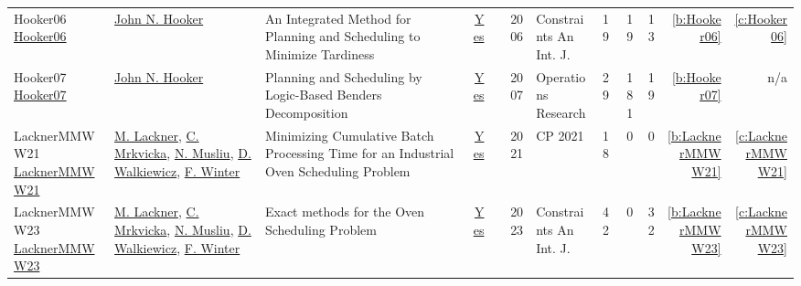 {\begin{longtable}{>{\raggedright\arraybackslash}p{3cm}>{\raggedright\arraybackslash}p{6cm}>{\raggedright\arraybackslash}p{6.5cm}rrrp{2.5cm}rrrrr}
Hooker06 \href{https://doi.org/10.1007/s10601-006-8060-2}{Hooker06} & \hyperref[auth:a161]{John N. Hooker} & An Integrated Method for Planning and Scheduling to Minimize Tardiness & \href{../works/Hooker06.pdf}{Yes} & \cite{Hooker06} & 2006 & Constraints An Int. J. & 19 & 19 & 13 & \ref{b:Hooker06} & \ref{c:Hooker06}\\
Hooker07 \href{http://dx.doi.org/10.1287/opre.1060.0371}{Hooker07} & \hyperref[auth:a161]{John N. Hooker} & Planning and Scheduling by Logic-Based Benders Decomposition & \href{../works/Hooker07.pdf}{Yes} & \cite{Hooker07} & 2007 & Operations Research & 29 & 181 & 19 & \ref{b:Hooker07} & n/a\\
LacknerMMWW21 \href{https://doi.org/10.4230/LIPIcs.CP.2021.37}{LacknerMMWW21} & \hyperref[auth:a62]{M. Lackner}, \hyperref[auth:a63]{C. Mrkvicka}, \hyperref[auth:a45]{N. Musliu}, \hyperref[auth:a46]{D. Walkiewicz}, \hyperref[auth:a43]{F. Winter} & Minimizing Cumulative Batch Processing Time for an Industrial Oven Scheduling Problem & \href{../works/LacknerMMWW21.pdf}{Yes} & \cite{LacknerMMWW21} & 2021 & CP 2021 & 18 & 0 & 0 & \ref{b:LacknerMMWW21} & \ref{c:LacknerMMWW21}\\
LacknerMMWW23 \href{https://doi.org/10.1007/s10601-023-09347-2}{LacknerMMWW23} & \hyperref[auth:a62]{M. Lackner}, \hyperref[auth:a63]{C. Mrkvicka}, \hyperref[auth:a45]{N. Musliu}, \hyperref[auth:a46]{D. Walkiewicz}, \hyperref[auth:a43]{F. Winter} & Exact methods for the Oven Scheduling Problem & \href{../works/LacknerMMWW23.pdf}{Yes} & \cite{LacknerMMWW23} & 2023 & Constraints An Int. J. & 42 & 0 & 32 & \ref{b:LacknerMMWW23} & \ref{c:LacknerMMWW23}\\
\end{longtable}
}


